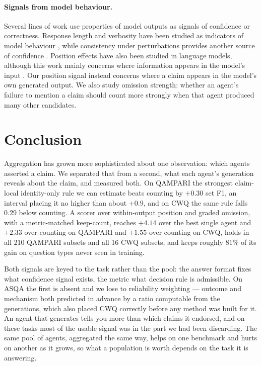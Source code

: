 \documentclass[11pt]{article}
\begin{document}
\paragraph{Signals from model behaviour.}
Several lines of work use properties of model outputs as signals of confidence or correctness. Response length and verbosity have been studied as indicators of model behaviour \citep{janiak2025illusion,zhang2024verbosity}, while consistency under perturbations provides another source of confidence \citep{wu2026this,ahn2025prompt}. Position effects have also been studied in language models, although this work mainly concerns where information appears in the model's input \citep{guo2024serial,zhang2026position,salvatore2025lost,qiao2026llm}. Our position signal instead concerns where a claim appears in the model's own generated output. We also study omission strength: whether an agent's failure to mention a claim should count more strongly when that agent produced many other candidates.



\section{Conclusion}
\label{sec:conclusion}

Aggregation has grown more sophisticated about one observation: which agents asserted a claim. We separated that from a second, what each agent's generation reveals about the claim, and measured both. On QAMPARI the strongest claim-local identity-only rule we can estimate beats counting by $+0.30$ set F1, an interval placing it no higher than about $+0.9$, and on CWQ the same rule falls $0.29$ below counting. A scorer over within-output position and graded omission, with a metric-matched keep-count, reaches $+4.14$ over the best single agent and $+2.33$ over counting on QAMPARI and $+1.55$ over counting on CWQ, holds in all 210 QAMPARI subsets and all 16 CWQ subsets, and keeps roughly $81\%$ of its gain on question types never seen in training.

Both signals are keyed to the task rather than the pool: the answer format fixes what confidence signal exists, the metric what decision rule is admissible. On ASQA the first is absent and we lose to reliability weighting --- outcome and mechanism both predicted in advance by a ratio computable from the generations, which also placed CWQ correctly before any method was built for it. An agent that generates tells you more than which claims it endorsed, and on these tasks most of the usable signal was in the part we had been discarding. The same pool of agents, aggregated the same way, helps on one benchmark and hurts on another as it grows, so what a population is worth depends on the task it is answering.
\end{document}
